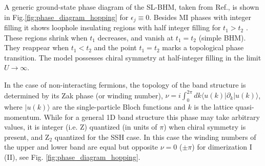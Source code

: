 \documentclass[pra,aps,twocolumn,showpacs]{revtex4}
\newcommand{\bra}[1]{\left.\langle #1 \right|}
\newcommand{\ket}[1]{\left| #1 \right.\rangle}
\begin{document}
A generic ground-state phase diagram of the SL-BHM, taken from Ref.\cite{Muth-PRA-2008},
 is shown in Fig.\ref{fig:phase_diagram_hopping} for $\epsilon_j\equiv 0$. Besides MI phases with integer filling it shows loophole insulating regions with half integer filling for $t_1 > t_2$
\cite{Buonsante-PRA-2004,Buonsante-PRA-2005}. These 
regions shrink when $t_1$ decreases, and vanish at $t_1=t_2$ (simple BHM). They reappear when $t_1 < t_2$ and the point $t_1=t_2$ marks a topological phase transition. The model possesses chiral symmetry at half-integer filling in the limit $U\to\infty$.

In the case of non-interacting fermions, the topology of the band structure is
determined by its Zak phase \cite{Zak1989} (or winding number),
$ \nu = i \int_0^{2 \pi} dk \bra{u(k)} \partial_k \ket{u(k)}$, where
$|u(k)\rangle$ are the single-particle Bloch functions and $k$ is the lattice quasi-momentum.
While for a general 1D band structure this phase may take arbitrary values, it is 
integer (i.e. Z) quantized (in units of $\pi$) \cite{Ryu2010} when 
chiral symmetry is present, and Z$_2$ quantized for the SSH case.
In this case the winding numbers of the upper and lower band are equal but opposite  $\nu=0$ ($\pm \pi$) 
for dimerization I (II), see Fig. \ref{fig:phase_diagram_hopping}.
\end{document}
